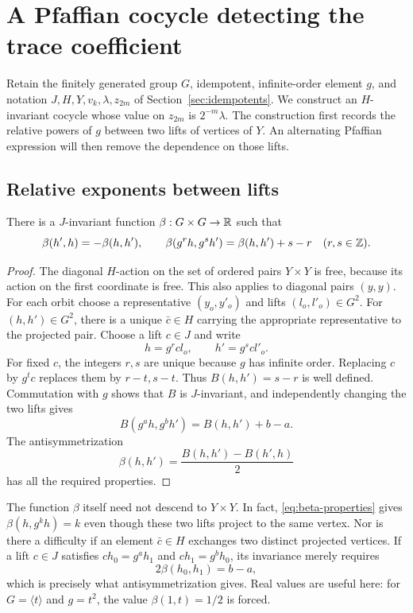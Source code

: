 \section{A Pfaffian cocycle detecting the trace coefficient}
\label{sec:detector}

Retain the finitely generated group $G$, idempotent, infinite-order element
$g$, and notation $J,H,Y,v_k,\lambda,z_{2m}$ of
Section~\ref{sec:idempotents}.  We construct an $H$-invariant cocycle whose
value on $z_{2m}$ is $2^{-m}\lambda$.  The construction first records the
relative powers of $g$ between two lifts of vertices of $Y$.  An alternating
Pfaffian expression will then remove the dependence on those lifts.

\subsection{Relative exponents between lifts}

\begin{lemma}\label{lem:beta}
There is a $J$-invariant function $\beta:G\times G\to\mathbb R$ such that
\begin{equation}\label{eq:beta-properties}
 \beta(h',h)=-\beta(h,h'),\qquad
 \beta(g^r h,g^s h')=\beta(h,h')+s-r
 \quad(r,s\in\mathbb Z).
\end{equation}
\end{lemma}

\begin{proof}
The diagonal $H$-action on the set of ordered pairs $Y\times Y$ is free,
because its action on the first coordinate is free.  This also applies to
diagonal pairs $(y,y)$.  For each orbit choose a representative $(y_o,y'_o)$
and lifts $(l_o,l'_o)\in G^2$.  For $(h,h')\in G^2$, there is a unique
$\bar c\in H$ carrying the appropriate representative to the projected
pair.  Choose a lift $c\in J$ and write
\[
 h=g^r c l_o,\qquad h'=g^s c l'_o.
\]
For fixed $c$, the integers $r,s$ are unique because $g$ has infinite order.
Replacing $c$ by $g^t c$ replaces them by $r-t,s-t$.  Thus
$B(h,h')=s-r$ is well defined.  Commutation with $g$ shows that $B$ is
$J$-invariant, and independently changing the two lifts gives
\[
 B(g^a h,g^b h')=B(h,h')+b-a.
\]
The antisymmetrization
\[
 \beta(h,h')=\frac{B(h,h')-B(h',h)}2
\]
has all the required properties.
\end{proof}

The function $\beta$ itself need not descend to $Y\times Y$.  In fact,
\eqref{eq:beta-properties} gives $\beta(h,g^k h)=k$ even though these two
lifts project to the same vertex.  Nor is there a difficulty if an element
$\bar c\in H$ exchanges two distinct projected vertices.  If a lift
$c\in J$ satisfies
$c h_0=g^a h_1$ and $c h_1=g^b h_0$, its invariance merely requires
\[
 2\beta(h_0,h_1)=b-a,
\]
which is precisely what antisymmetrization gives.  Real values are useful
here: for $G=\langle t\rangle$ and $g=t^2$, the value
$\beta(1,t)=1/2$ is forced.


